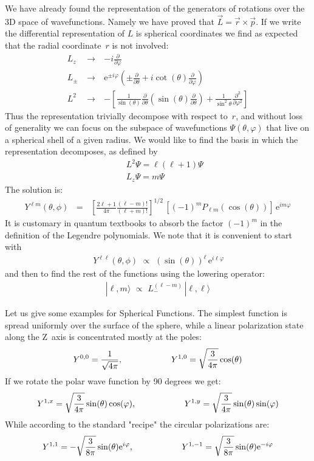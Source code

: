 \documentclass[onecolumn,fleqn, 11pt]{revtex4}
\newcommand{\eexp}{\mathrm{e}^}
\newcommand{\beq}{\begin{eqnarray}}
\newcommand{\eeq}{\end{eqnarray}}
\begin{document}
We have already found the  
representation of the generators 
of rotations over the 3D space 
of wavefunctions. 
Namely we have proved that $\vec{L}=\vec{r}\times \vec{p}$. 
If we write the differential 
representation of $L$ is spherical 
coordinates we find as expected that 
the radial coordinate~$r$ is not involved: 
\beq
 L_z & \ \rightarrow \ & - i \frac{\partial}{\partial \varphi }
\\ 
 L_\pm  & \ \rightarrow \ &  \eexp{\pm i \varphi} \left(\pm \frac {\partial} { \partial \theta} 
+ i \cot (\theta)\frac{\partial}{\partial \varphi}\right)
\\ 
L^2 & \ \rightarrow \ & - \left[\frac{1}{\sin (\theta)} 
\frac{\partial}{\partial \theta} (\sin (\theta) \frac{\partial}{\partial \theta}) 
+ \frac {1}{\sin^2 \theta} \frac{\partial^2}{\partial \varphi ^2}\right] 
\eeq
Thus the representation trivially 
decompose with respect to~$r$, 
and without loss of generality 
we can focus on the subspace of 
wavefunctions ${\Psi(\theta,\varphi)}$  
that live on a spherical shell of a given radius. 
We would like to find the basis 
in which the representation decomposes,    
as defined by 
\beq
&& L^2\Psi = \ell(\ell+1)\Psi
\\ 
&& L_z\Psi = m\Psi
\eeq
The solution is:
\beq
Y^{\ell m}(\theta , \phi) \,\ \ = \ \ \, 
\left[ \frac{2\ell+1}{4\pi} \frac{(\ell-m)!}{(\ell+m)!} \right]^{1/2} \, 
\left[ (-1)^m P_{\ell m}(\cos(\theta))\right] \, \eexp{im\varphi } 
\eeq
It is customary in quantum textbooks to absorb 
the factor ${(-1)^m}$ in the definition of the Legendre polynomials. 
We note that it is convenient to start with 
\beq
\, Y^{\ell \ell}(\theta , \phi) 
\,\, \propto \,\, 
(\sin(\theta))^{\ell} \, \eexp{i \ell \varphi } 
\eeq
and then to find the rest of the functions using the lowering operator:
\beq
| \ell,m \rangle 
\,\, \propto \,\, 
L_{-}^{(\ell-m)} 
\, |\ell,\ell\rangle 
\eeq


Let us give some examples for Spherical Functions. 
The simplest function is spread uniformly 
over the surface of the sphere, 
while a linear polarization state along the Z~axis 
is concentrated mostly at the poles:
\beq
Y^{0,0} = \frac{1}{\sqrt{4\pi}}, 
\hspace*{2cm}
Y^{1,0} = \sqrt{\frac{3}{4\pi}} \cos(\theta) 
\eeq
If we rotate the polar wave function by 90 degrees we get:
\beq
Y^{1,x} = \sqrt{\frac{3}{4\pi}} \sin(\theta)\cos(\varphi), 
\hspace*{2cm}
Y^{1,y} = \sqrt{\frac{3}{4\pi}} \sin(\theta)\sin(\varphi) 
\eeq
While according to the standard "recipe" the circular polarizations are:
\beq
Y^{1,1} = -\sqrt{\frac{3}{8\pi}} \sin(\theta) \eexp{i \varphi},
\hspace*{2cm}
Y^{1,-1} = \sqrt{\frac{3}{8\pi}} \sin(\theta) \eexp{-i \varphi} 
\eeq
\end{document}
